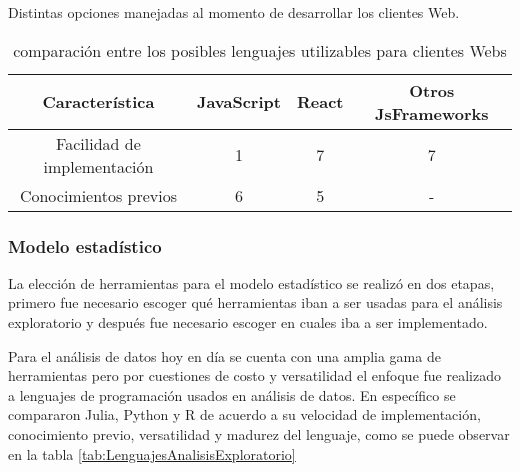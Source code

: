     \begin{table}[ht]
        \caption[Comparativa de posibles lenguajes nivel cliente Web]{comparación entre
        los posibles lenguajes utilizables para clientes Webs}
        \label{tab:LenguajesCliente}
        \begin{center}
            Distintas opciones manejadas al momento de desarrollar los clientes Web.\\

            \vspace{0.3cm}
            \begin{tabular}{|c|c|c|c|}
                \hline
                Característica              & JavaScript & React & Otros JsFrameworks\\\hline
                \hline
                Facilidad de implementación & 1         & 7     &  7\\\hline
                Conocimientos previos       & 6         & 5     &  - \\\hline
            \end{tabular}
        \end{center}
    \end{table}



    \subsubsection{Modelo estadístico}
    La elección de herramientas para el modelo estadístico se realizó en dos
    etapas, primero fue necesario escoger qué herramientas iban a ser usadas
    para el análisis exploratorio y después fue necesario escoger en cuales iba
    a ser implementado.

    Para el análisis de datos hoy en día se cuenta con una amplia gama de
    herramientas pero por cuestiones de costo y versatilidad el enfoque fue
    realizado a lenguajes de programación usados en análisis de datos. En
    específico se compararon Julia, Python y R de acuerdo a su velocidad de
    implementación, conocimiento previo, versatilidad y madurez del lenguaje, como
    se puede observar en la tabla \ref{tab:LenguajesAnalisisExploratorio}

